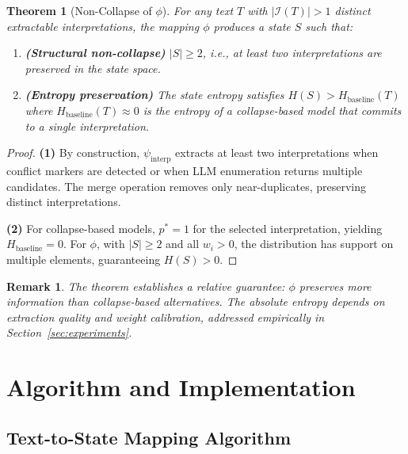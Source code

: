 \documentclass[11pt,a4paper]{article}
\newtheorem{theorem}{Theorem}
\newtheorem{remark}{Remark}
\begin{document}
\begin{theorem}[Non-Collapse of $\phi$]
\label{thm:noncollapse}
For any text $T$ with $|\mathcal{I}(T)| > 1$ distinct extractable interpretations, 
the mapping $\phi$ produces a state $S$ such that:
\begin{enumerate}
    \item \textbf{(Structural non-collapse)} $|S| \geq 2$, i.e., at least two 
          interpretations are preserved in the state space.
    \item \textbf{(Entropy preservation)} The state entropy satisfies
          $H(S) > H_{\text{baseline}}(T)$
          where $H_{\text{baseline}}(T) \approx 0$ is the entropy of a 
          collapse-based model that commits to a single interpretation.
\end{enumerate}
\end{theorem}

\begin{proof}
\textbf{(1)} By construction, $\psi_{\text{interp}}$ extracts at least two 
interpretations when conflict markers are detected or when LLM enumeration 
returns multiple candidates. The merge operation removes only near-duplicates, 
preserving distinct interpretations.

\textbf{(2)} For collapse-based models, $p^* = 1$ for the selected interpretation, 
yielding $H_{\text{baseline}} = 0$. For $\phi$, with $|S| \geq 2$ and all $w_i > 0$, 
the distribution has support on multiple elements, guaranteeing $H(S) > 0$.
\end{proof}

\begin{remark}
The theorem establishes a \textit{relative} guarantee: $\phi$ preserves 
more information than collapse-based alternatives. The absolute entropy 
depends on extraction quality and weight calibration, addressed empirically 
in Section~\ref{sec:experiments}.
\end{remark}

\section{Algorithm and Implementation}
\label{sec:algorithm}

\subsection{Text-to-State Mapping Algorithm}
\end{document}
